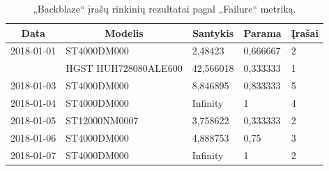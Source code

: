 \documentclass{VUMIFPSkursinis}
\begin{document}
\begin{table}[H]
\centering
\caption{„Backblaze“ įrašų rinkinių rezultatai pagal „Failure“ metriką.}
\label{tab:rezFail}
{\begin{tabular}{|l|l|l|l|l|}
\hline
\multicolumn{1}{|c|}{\textbf{Data}} & \multicolumn{1}{c|}{\textbf{Modelis}} & \multicolumn{1}{c|}{\textbf{Santykis}} & \multicolumn{1}{c|}{\textbf{Parama}} & \multicolumn{1}{c|}{\textbf{Įrašai}} \\ \hline
2018-01-01                          & ST4000DM000                           & 2,48423                                & 0,666667                             & 2                                    \\ \hline
\cellcolor[HTML]{C0C0C0}            & HGST HUH728080ALE600                  & 42,566018                              & 0,333333                             & 1                                    \\ \hline
2018-01-03                          & ST4000DM000                           & 8,846895                               & 0,833333                             & 5                                    \\ \hline
2018-01-04                          & ST4000DM000                           & Infinity                               & 1                                    & 4                                    \\ \hline
2018-01-05                          & ST12000NM0007                         & 3,758622                               & 0,333333                             & 2                                    \\ \hline
2018-01-06                          & ST4000DM000                           & 4,888753                               & 0,75                                 & 3                                    \\ \hline
2018-01-07                          & ST4000DM000                           & Infinity                               & 1                                    & 2                                    \\ \hline
\end{tabular}}
\end{table}
\end{document}
